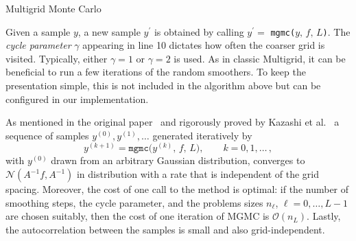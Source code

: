 \documentclass[
fontsize=11pt,
paper=a4,
numbers=noenddot
]{scrartcl}
\begin{document}
\begin{algorithm}
    \DontPrintSemicolon



    \SetAlgoLined

    \caption{Multigrid Monte Carlo}\label{alg:mgmc}
\end{algorithm}

Given a sample $y$, a new sample $y^\prime$ is obtained by calling $y^\prime =$ \texttt{mgmc(}$y,\, f,\, L$\texttt{)}. The \emph{cycle parameter} $\gamma$ appearing in line 10 dictates how often the coarser grid is visited. Typically, either $\gamma = 1$ or $\gamma = 2$ is used. As in classic Multigrid, it can be beneficial to run a few iterations of the random smoothers. To keep the presentation simple, this is not included in the algorithm above but can be configured in our implementation.

As mentioned in the original paper~\cite{goodmansokal} and rigorously proved by Kazashi et al.~\cite{kazashimuellerscheichl} a sequence of samples $y^{(0)}, y^{(1)}, \dotsc$ generated iteratively by 
\begin{equation*}
    y^{(k+1)} = \texttt{mgmc(}y^{(k)},\, f,\, L\texttt{)},\qquad k = 0,1,\dotsc\,,
\end{equation*}
with $y^{(0)}$ drawn from an arbitrary Gaussian distribution, converges to $\mathcal{N}(A^{-1}f, A^{-1})$ in distribution with a rate that is independent of the grid spacing. Moreover, the cost of one call to the method is optimal: if the number of smoothing steps, the cycle parameter, and the problems sizes $n_\ell$, $\ell = 0,\dotsc,L-1$ are chosen suitably, then the cost of one iteration of MGMC is $\mathcal{O}(n_L)$. Lastly, the autocorrelation between the samples is small and also grid-independent.
\end{document}
